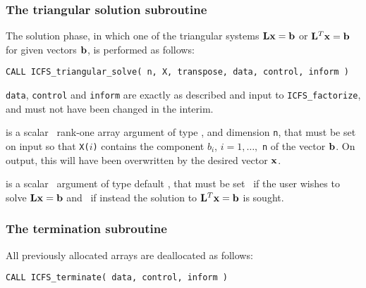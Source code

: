 \documentclass{galahad}
\newcommand{\packagename}{ICFS}
\begin{document}

\subsubsection{The triangular solution subroutine}

The solution phase, in which one of the triangular systems
${\mathbf{L}} {\mathbf{x}} = {\mathbf{b}}$ or ${\mathbf{L}}^T {\mathbf{x}} = {\mathbf{b}}$ for given vectors ${\mathbf{b}}$,
is performed as follows:
\vspace*{1mm}

\hspace{8mm}
{\tt CALL \packagename\_triangular\_solve( n, X, transpose, data, control, inform )}
\vspace*{-1mm}

\begin{description}
 {\tt data}, {\tt control} and {\tt inform} are
exactly as described and input to {\tt \packagename\_factorize},
and must not have been changed in the interim.

 is a scalar \intentinout\ rank-one array argument of type
\realdp, and dimension {\tt n}, that  must be set on input so that
{\tt X(}$i${\tt)} contains the component $b_i$, $i = 1, \ldots,$ {\tt n}
of the vector ${\mathbf{b}}$. On output, this will have been overwritten by the
desired vector ${\mathbf{x}}$.

 is a scalar \intentin\ argument of type
default \logical, that must be set \false\ if the user wishes to solve
${\mathbf{L}} {\mathbf{x}} = {\mathbf{b}}$ and \true\ if instead the solution to ${\mathbf{L}}^T {\mathbf{x}} = {\mathbf{b}}$
is sought.

\end{description}


\subsubsection{The  termination subroutine}
All previously allocated arrays are deallocated as follows:
\vspace*{1mm}

\hspace{8mm}
{\tt CALL \packagename\_terminate( data, control, inform )}
\end{document}
